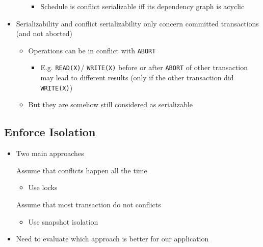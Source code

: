 \begin{itemize}
\begin{itemize}
\begin{itemize}
                    \item Schedule is conflict serializable iff its dependency graph is acyclic
                \end{itemize}
        \end{itemize}
    \item Serializability and conflict serializability only concern committed transactions (and not aborted)
        \begin{itemize}
            \item Operations can be in conflict with \verb+ABORT+
                \begin{itemize}
                    \item E.g. \verb+READ(X)+/ \verb+WRITE(X)+ before or after \verb+ABORT+ of other transaction may lead to different results (only if the other transaction did \verb+WRITE(X)+)
                \end{itemize}
            \item But they are somehow still considered as serializable
        \end{itemize}
\end{itemize}

\subsection{Enforce Isolation}
\begin{itemize}
     Only allow schedules that are conflict serializable
    \item Two main approaches
        \begin{itemize}
             Assume that conflicts happen all the time
                \begin{itemize}
                    \item Use locks
                \end{itemize}
             Assume that most transaction do not conflicts
                \begin{itemize}
                    \item Use snapshot isolation
                \end{itemize}
        \end{itemize}
    \item Need to evaluate which approach is better for our application
\end{itemize}

